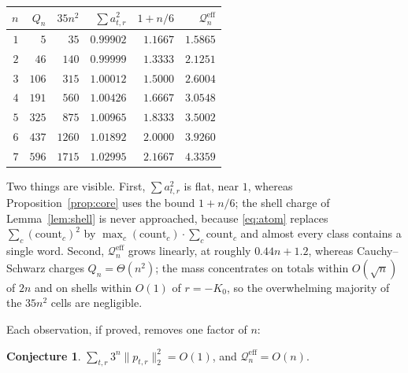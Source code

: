 \documentclass[11pt,reqno]{amsart}
\theoremstyle{plain}
\theoremstyle{definition}
\newtheorem{conjecture}[theorem]{Conjecture}
\theoremstyle{remark}
\begin{document}
\begin{center}
\begin{tabular}{@{}rrrrrr@{}}
\toprule
$n$ & $Q_n$ & $35n^2$ & $\sum a_{t,r}^2$ & $1+n/6$ & $\mathcal Q_n^{\mathrm{eff}}$\\
\midrule
$1$ & $5$   & $35$   & $0.99902$ & $1.1667$ & $1.5865$\\
$2$ & $46$  & $140$  & $0.99999$ & $1.3333$ & $2.1251$\\
$3$ & $106$ & $315$  & $1.00012$ & $1.5000$ & $2.6004$\\
$4$ & $191$ & $560$  & $1.00426$ & $1.6667$ & $3.0548$\\
$5$ & $325$ & $875$  & $1.00965$ & $1.8333$ & $3.5002$\\
$6$ & $437$ & $1260$ & $1.01892$ & $2.0000$ & $3.9260$\\
$7$ & $596$ & $1715$ & $1.02995$ & $2.1667$ & $4.3359$\\
\bottomrule
\end{tabular}
\end{center}

Two things are visible. First, $\sum a_{t,r}^2$ is flat, near $1$, whereas
Proposition~\ref{prop:core} uses the bound $1+n/6$; the shell charge of
Lemma~\ref{lem:shell} is never approached, because \eqref{eq:atom} replaces
$\sum_c(\text{count}_c)^2$ by $\max_c(\text{count}_c)\cdot\sum_c\text{count}_c$
and almost every class contains a single word. Second,
$\mathcal Q_n^{\mathrm{eff}}$ grows linearly, at roughly $0.44n+1.2$,
whereas Cauchy--Schwarz charges $Q_n=\Theta(n^2)$; the mass concentrates on
totals within $O(\sqrt n)$ of $2n$ and on shells within $O(1)$ of
$r=-K_0$, so the overwhelming majority of the $35n^2$ cells are negligible.

Each observation, if proved, removes one factor of $n$:

\begin{conjecture}\label{conj:two}
$\sum_{t,r}3^n\|p_{t,r}\|_2^2=O(1)$, and
$\mathcal Q_n^{\mathrm{eff}}=O(n)$.
\end{conjecture}
\end{document}
